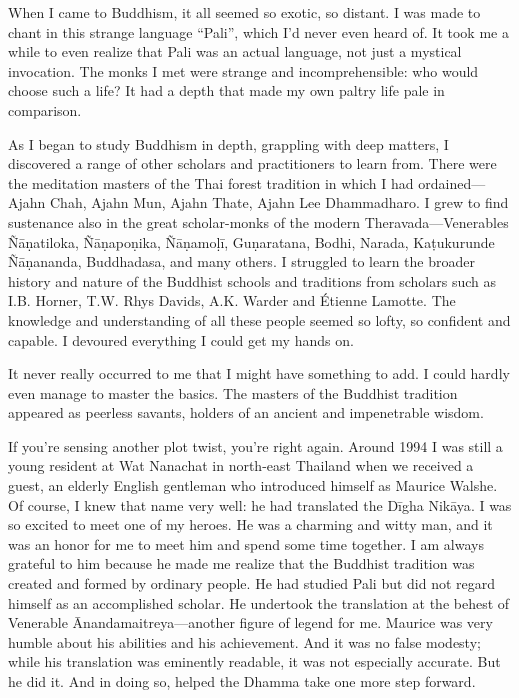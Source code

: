 \documentclass[12pt,openany]{book}%
\begin{document}
When I came to Buddhism, it all seemed so exotic, so distant. I was made to chant in this strange language “Pali”, which I’d never even heard of. It took me a while to even realize that Pali was an actual language, not just a mystical invocation. The monks I met were strange and incomprehensible: who would choose such a life? It had a depth that made my own paltry life pale in comparison.

As I began to study Buddhism in depth, grappling with deep matters, I discovered a range of other scholars and practitioners to learn from. There were the meditation masters of the Thai forest tradition in which I had ordained—Ajahn Chah, Ajahn Mun, Ajahn Thate, Ajahn Lee Dhammadharo. I grew to find sustenance also in the great scholar-monks of the modern Theravada—Venerables \textsanskrit{Ñāṇatiloka}, \textsanskrit{Ñāṇapoṇika}, \textsanskrit{Ñāṇamoḷī}, \textsanskrit{Guṇaratana}, Bodhi, Narada, \textsanskrit{Kaṭukurunde} \textsanskrit{Ñāṇananda}, Buddhadasa, and many others. I struggled to learn the broader history and nature of the Buddhist schools and traditions from scholars such as I.B. Horner, T.W. Rhys Davids, A.K. Warder and Étienne Lamotte. The knowledge and understanding of all these people seemed so lofty, so confident and capable. I devoured everything I could get my hands on.

It never really occurred to me that I might have something to add. I could hardly even manage to master the basics. The masters of the Buddhist tradition appeared as peerless savants, holders of an ancient and impenetrable wisdom.

If you’re sensing another plot twist, you’re right again. Around 1994 I was still a young resident at Wat Nanachat in north-east Thailand when we received a guest, an elderly English gentleman who introduced himself as Maurice Walshe. Of course, I knew that name very well: he had translated the \textsanskrit{Dīgha} \textsanskrit{Nikāya}. I was so excited to meet one of my heroes. He was a charming and witty man, and it was an honor for me to meet him and spend some time together. I am always grateful to him because he made me realize that the Buddhist tradition was created and formed by ordinary people. He had studied Pali but did not regard himself as an accomplished scholar. He undertook the translation at the behest of Venerable Ānandamaitreya—another figure of legend for me. Maurice was very humble about his abilities and his achievement. And it was no false modesty; while his translation was eminently readable, it was not especially accurate. But he did it. And in doing so, helped the Dhamma take one more step forward.
\end{document}
